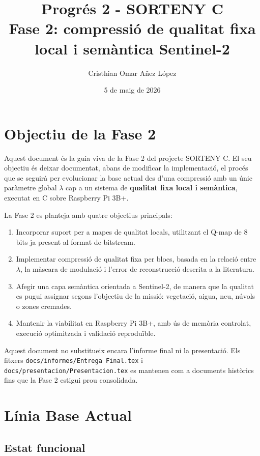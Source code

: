 \documentclass[11pt,a4paper]{article}
\title{\textbf{Progrés 2 - SORTENY C}\\
Fase 2: compressió de qualitat fixa local i semàntica Sentinel-2}
\author{Cristhian Omar Añez López}
\date{5 de maig de 2026}
\begin{document}
\maketitle
\tableofcontents
\newpage

\section{Objectiu de la Fase 2}

Aquest document és la guia viva de la Fase 2 del projecte SORTENY C. El seu objectiu és deixar documentat, abans de modificar la implementació, el procés que se seguirà per evolucionar la base actual des d'una compressió amb un únic paràmetre global $\lambda$ cap a un sistema de \textbf{qualitat fixa local i semàntica}, executat en C sobre Raspberry Pi 3B+.

La Fase 2 es planteja amb quatre objectius principals:
\begin{enumerate}
  \item Incorporar suport per a mapes de qualitat locals, utilitzant el Q-map de 8 bits ja present al format de bitstream.
  \item Implementar compressió de qualitat fixa per blocs, basada en la relació entre $\lambda$, la màscara de modulació i l'error de reconstrucció descrita a la literatura.
  \item Afegir una capa semàntica orientada a Sentinel-2, de manera que la qualitat es pugui assignar segons l'objectiu de la missió: vegetació, aigua, neu, núvols o zones cremades.
  \item Mantenir la viabilitat en Raspberry Pi 3B+, amb ús de memòria controlat, execució optimitzada i validació reproduïble.
\end{enumerate}

Aquest document no substitueix encara l'informe final ni la presentació. Els fitxers \texttt{docs/informes/Entrega Final.tex} i \texttt{docs/presentacion/Presentacion.tex} es mantenen com a documents històrics fins que la Fase 2 estigui prou consolidada.

\section{Línia Base Actual}

\subsection{Estat funcional}
\end{document}
